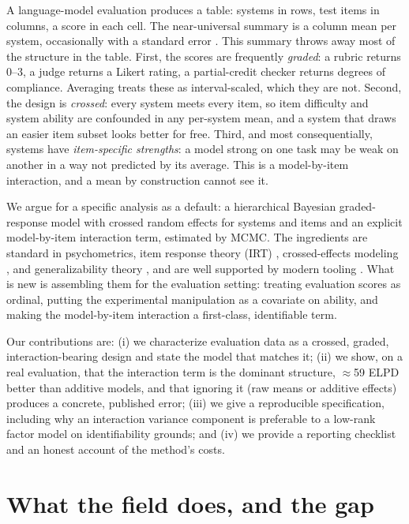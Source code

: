 \documentclass{llncs}
\begin{document}
A language-model evaluation produces a table: systems in rows, test items in
columns, a score in each cell. The near-universal summary is a column mean
per system, occasionally with a standard error \parencite{miller2024errorbars}.
This summary throws away most of the structure in the table. First, the
scores are frequently \emph{graded}: a rubric returns 0--3, a judge returns a
Likert rating, a partial-credit checker returns degrees of compliance.
Averaging treats these as interval-scaled, which they are not. Second, the
design is \emph{crossed}: every system meets every item, so item difficulty
and system ability are confounded in any per-system mean, and a system that
draws an easier item subset looks better for free. Third, and most
consequentially, systems have \emph{item-specific strengths}: a model strong
on one task may be weak on another in a way not predicted by its average.
This is a model-by-item interaction, and a mean by construction cannot see
it.

We argue for a specific analysis as a default: a hierarchical Bayesian
graded-response model with crossed random effects for systems and items and
an explicit model-by-item interaction term, estimated by MCMC. The
ingredients are standard in psychometrics, item response theory (IRT)
\parencite{samejima1969grm, deboeck2004explanatory}, crossed-effects modeling
\parencite{baayen2008crossed}, and generalizability theory
\parencite{brennan2001gtheory}, and are well supported by modern tooling
\parencite{burkner2021irt, mcelreath2020rethinking, pymc2023}. What is new is
assembling them for the evaluation setting: treating evaluation scores as
ordinal, putting the experimental manipulation as a covariate on ability, and
making the model-by-item interaction a first-class, identifiable term.

Our contributions are: (i) we characterize evaluation data as a crossed,
graded, interaction-bearing design and state the model that matches it;
(ii) we show, on a real evaluation, that the interaction term is the dominant
structure, $\approx$59 ELPD better than additive models, and that ignoring
it (raw means or additive effects) produces a concrete, published error;
(iii) we give a reproducible specification, including why an interaction
variance component is preferable to a low-rank factor model on
identifiability grounds; and (iv) we provide a reporting checklist and an
honest account of the method's costs.

\section{What the field does, and the gap}
\label{sec:gap}
\end{document}
